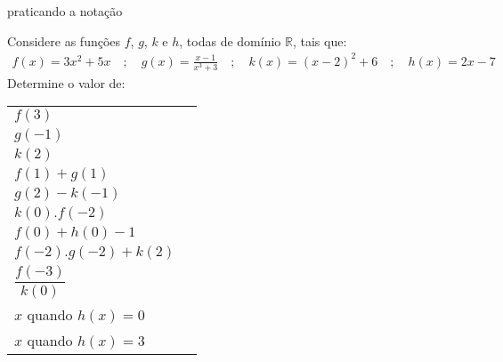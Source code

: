 \documentclass[extrafontsizes, twoside, 11pt, openright, final]{memoir}
\begin{document}
\begin{task}{ praticando a notação}
	\label{\detokenize{AF106-2:atividade-praticando-a-notacao}}\label{\detokenize{AF106-2:ativ-praticando-notacao}}

	Considere as funções $f$, $g$, $k$ e $h$, todas de domínio $\mathbb{R}$, tais que:
	\begin{equation*}
		\begin{split}f(x)=3x^2+5x\quad ; \quad g(x)=\frac{x-1}{x^3+3}\quad ; \quad k(x)=(x-2)^2+6\quad ; \quad h(x)=2x-7\end{split}
	\end{equation*}
	Determine o valor de:


	\begin{table}[H]
		\centering
		\begin{tabular}{|l|c|}
			\hline
			\hline
			\tcolor{Função}       & \tcolor{Valor} \\
			\hline
			$f(3)$                &                \\
			\hline
			$g(-1)$               &                \\
			\hline
			$k(2)$                &                \\
			\hline
			$f(1)+g(1)$           &                \\
			\hline
			$g(2)-k(-1)$          &                \\
			\hline
			$k(0).f(-2)$          &                \\
			\hline
			$f(0)+h(0)-1$         &                \\
			\hline
			$f(-2).g(-2)+k(2)$    &                \\
			\hline
			$\dfrac{f(-3)}{k(0)}$ &                \\
			\hline
			$x$ quando $h(x)=0$   &                \\
			\hline
			$x$ quando $h(x)=3$   &                \\
			\hline
		\end{tabular}
	\end{table}

\end{task}
\end{document}
